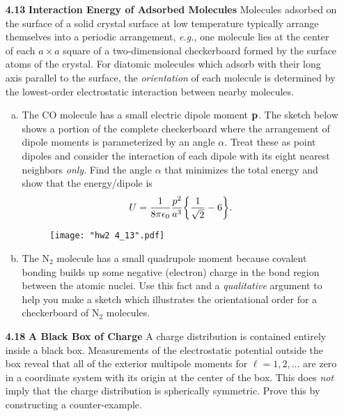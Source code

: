 \documentclass{article}
\begin{document}
\begin{enumerate}
    \item [\textbf{4.13}] \textbf{Interaction Energy of Adsorbed Molecules } Molecules adsorbed on the surface of a solid crystal surface at low temperature typically arrange themselves into a periodic arrangement, \textit{e.g.}, one molecule lies at the center of each $a\times a$ square of a two-dimensional checkerboard formed by the surface atoms of the crystal. For diatomic molecules which adsorb with their long axis parallel to the surface, the \textit{orientation} of each molecule is determined by the lowest-order electrostatic interaction between nearby molecules.
    \begin{enumerate}[(a)]
        \item The CO molecule has a small electric dipole moment $\vb{p}$. The sketch below shows a portion of the complete checkerboard where the arrangement of dipole moments is parameterized by an angle $\alpha$. Treat these as point dipoles and consider the interaction of each dipole with its eight nearest neighbors \textit{only}. Find the angle $\alpha$ that minimizes the total energy and show that the energy/dipole is
        \[
            U = \frac{1}{8\pi\epsilon_0}\frac{p^2}{a^3}\qty{\frac{1}{\sqrt{2}}-6}.
        \]
        \begin{figure}[H]
        \centering
        \texttt{[image: "hw2 4\_13".pdf]}
        \end{figure}

        \item The $\text{N}_2$ molecule has a small quadrupole moment because covalent bonding builds up some negative (electron) charge in the bond region between the atomic nuclei. Use this fact and a \textit{qualitative} argument to help you make a sketch which illustrates the orientational order for a checkerboard of $\text{N}_2$ molecules.
    \end{enumerate}

    \item [\textbf{4.18}] \textbf{A Black Box of Charge } A charge distribution is contained entirely inside a black box. Measurements of the electrostatic potential outside the box reveal that all of the exterior multipole moments for $\ell = 1,2,\ldots$ are zero in a coordinate system with its origin at the center of the box. This does \textit{not} imply that the charge distribution is spherically symmetric. Prove this by constructing a counter-example.


\end{enumerate}
\end{document}
